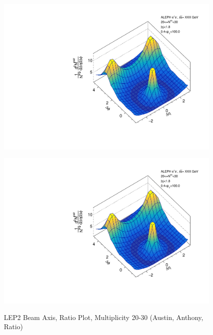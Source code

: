 \begin{figure}[htbp]
  \caption{LEP2 Beam Axis, Ratio Plot, Multiplicity 20-30 (Austin, Anthony, Ratio)}
  \begin{minipage}[b]{0.32\linewidth}
    \centering
    \includegraphics[width=\linewidth]{images/TwoParticleCorrelation/LEP2_BEAM/LEP2_BEAM_ratio1_20_30.pdf}
    \label{fig:LEP2 Beam Axis, Ratio Plot, Multiplicity 20-30, Austin}
  \end{minipage}
  \hspace{0.0cm}
  \begin{minipage}[b]{0.32\linewidth}
    \centering
    \includegraphics[width=\linewidth]{images/TwoParticleCorrelation/LEP2_BEAM/LEP2_BEAM_ratio2_20_30.pdf}
    \label{fig:LEP2 Beam Axis, Ratio Plot, Multiplicity 20-30, Anthony}

\end{minipage}
\end{figure}

